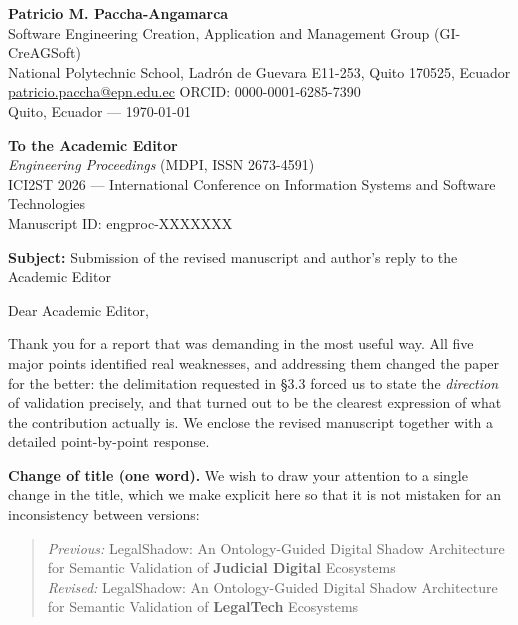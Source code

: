 \documentclass[11pt,a4paper]{article}
\begin{document}
{\raggedright
\textbf{Patricio M. Paccha-Angamarca}\\
Software Engineering Creation, Application and Management Group (GI-CreAGSoft)\\
National Polytechnic School, Ladrón de Guevara E11-253, Quito 170525, Ecuador\\
\href{mailto:patricio.paccha@epn.edu.ec}{patricio.paccha@epn.edu.ec} \quad ORCID: 0000-0001-6285-7390\\[6pt]
Quito, Ecuador --- \today\par}

\vspace{10pt}

{\raggedright
\textbf{To the Academic Editor}\\
\emph{Engineering Proceedings} (MDPI, ISSN 2673-4591)\\
ICI2ST 2026 --- International Conference on Information Systems and Software Technologies\\
Manuscript ID: engproc-XXXXXXX\par}

\vspace{12pt}

\textbf{Subject:} Submission of the revised manuscript and author's reply to the Academic Editor

\vspace{8pt}

Dear Academic Editor,

Thank you for a report that was demanding in the most useful way. All five major points identified real weaknesses, and addressing them changed the paper for the better: the delimitation requested in §3.3 forced us to state the \emph{direction} of validation precisely, and that turned out to be the clearest expression of what the contribution actually is. We enclose the revised manuscript together with a detailed point-by-point response.

\vspace{4pt}
{\color{hi}\textbf{Change of title (one word).}}
We wish to draw your attention to a single change in the title, which we make explicit here so that it is not mistaken for an inconsistency between versions:

\vspace{4pt}
\begin{quote}
\emph{Previous:} LegalShadow: An Ontology-Guided Digital Shadow Architecture for Semantic Validation of \textbf{Judicial Digital} Ecosystems\\[4pt]
\emph{Revised:} LegalShadow: An Ontology-Guided Digital Shadow Architecture for Semantic Validation of \textbf{LegalTech} Ecosystems
\end{quote}
\end{document}

